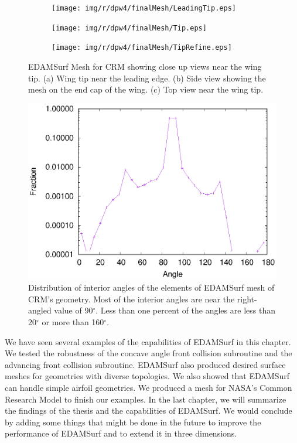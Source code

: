 \begin{figure}[!hbt]
	\centering
	\begin{subfigure}{\textwidth}
		\centering
		\texttt{[image: img/r/dpw4/finalMesh/LeadingTip.eps]}
		\caption{}
		\label{dLeadingTip}
	\end{subfigure}
	\begin{subfigure}{\textwidth}
		\centering
		\texttt{[image: img/r/dpw4/finalMesh/Tip.eps]}
		\caption{}
		\label{dTip}
	\end{subfigure}    
	\begin{subfigure}{\textwidth}
		\centering
		\texttt{[image: img/r/dpw4/finalMesh/TipRefine.eps]}
		\caption{}
		\label{dTipRefine}
	\end{subfigure}
	\caption[Close up views near wing tip of EDAMSurf mesh of CRM.]{EDAMSurf Mesh for CRM showing close up views near the wing tip. (a) Wing tip near the leading edge. (b) Side view showing the mesh on the end cap of the wing. (c) Top view near the wing tip.}
	\label{fig-dpw4Tip}
\end{figure}

\begin{figure}
	\centering
	\includegraphics[width=0.8\linewidth]{img/r/dpw4/quality.eps}
	\caption[Quality of EDAMSurf mesh for CRM showing the distribution of interior angles.]{Distribution of interior angles of the elements of EDAMSurf mesh of CRM's geometry. Most of the interior angles are near the right-angled value of 90$^\circ$. Less than one percent of the angles are less than 20$^\circ$ or more than 160$^\circ$.}
	\label{fig-quality}
\end{figure}

We have seen several examples of the capabilities of EDAMSurf in this chapter. We tested the robustness of the concave angle front collision subroutine and the advancing front collision subroutine. EDAMSurf also produced desired surface meshes for geometries with diverse topologies. We also showed that EDAMSurf can handle simple airfoil geometries. We produced a mesh for NASA's Common Research Model to finish our examples. In the last chapter, we will summarize the findings of the thesis and the capabilities of EDAMSurf. We would conclude by adding some things that might be done in the future to improve the performance of EDAMSurf and to extend it in three dimensions.